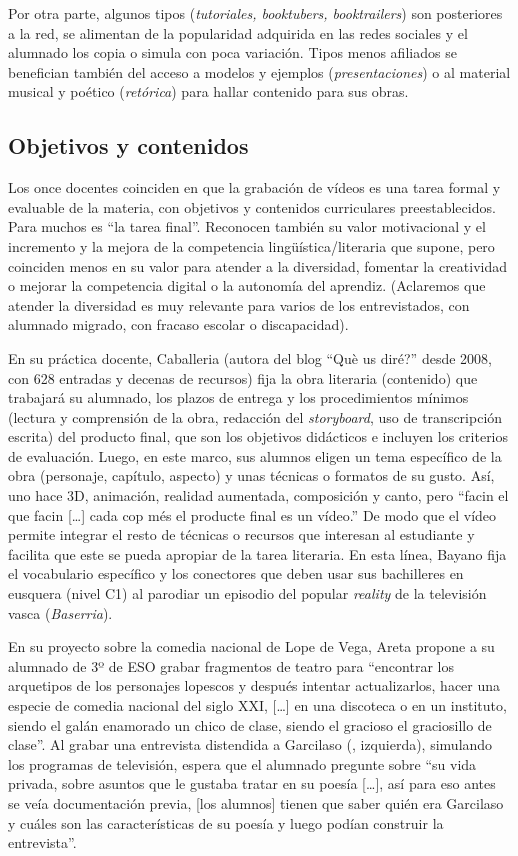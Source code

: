 \documentclass[spanish]{textolivre}
\begin{document}
Por otra parte, algunos tipos (\textit{tutoriales, booktubers, booktrailers}) son posteriores a la red, se alimentan de la popularidad adquirida en las redes sociales y el alumnado los copia o simula con poca variación. Tipos menos afiliados se benefician también del acceso a modelos y ejemplos (\textit{presentaciones}) o al material musical y poético (\textit{retórica}) para hallar contenido para sus obras.


\subsection{Objetivos y contenidos}\label{sec-organizacao}
Los once docentes coinciden en que la grabación de vídeos es una tarea formal y evaluable de la materia, con objetivos y contenidos curriculares preestablecidos. Para muchos es “la tarea final”. Reconocen también su valor motivacional y el incremento y la mejora de la competencia lingüística/literaria que supone, pero coinciden menos en su valor para atender a la diversidad, fomentar la creatividad o mejorar la competencia digital o la autonomía del aprendiz. (Aclaremos que atender la diversidad es muy relevante para varios de los entrevistados, con alumnado migrado, con fracaso escolar o discapacidad).

En su práctica docente, Caballeria (autora del blog “Què us diré?” desde 2008, con 628 entradas y decenas de recursos) fija la obra literaria (contenido) que trabajará su alumnado, los plazos de entrega y los procedimientos mínimos (lectura y comprensión de la obra, redacción del \textit{storyboard}, uso de transcripción escrita) del producto final, que son los objetivos didácticos e incluyen los criterios de evaluación. Luego, en este marco, sus alumnos eligen un tema específico de la obra (personaje, capítulo, aspecto) y unas técnicas o formatos de su gusto. Así, uno hace 3D, animación, realidad aumentada, composición y canto, pero “facin el que facin […] cada cop més el producte final es un vídeo.” De modo que el vídeo permite integrar el resto de técnicas o recursos que interesan al estudiante y facilita que este se pueda apropiar de la tarea literaria. En esta línea, Bayano fija el vocabulario específico y los conectores que deben usar sus bachilleres en eusquera (nivel C1) al parodiar un episodio del popular \textit{reality} de la televisión vasca (\textit{Baserria}).

En su proyecto sobre la comedia nacional de Lope de Vega, Areta propone a su alumnado de 3º de ESO grabar fragmentos de teatro para “encontrar los arquetipos de los personajes lopescos y después intentar actualizarlos, hacer una especie de comedia nacional del siglo XXI, […] en una discoteca o en un instituto, siendo el galán enamorado un chico de clase, siendo el gracioso el graciosillo de clase”. Al grabar una entrevista distendida a Garcilaso (, izquierda), simulando los programas de televisión, espera que el alumnado pregunte sobre “su vida privada, sobre asuntos que le gustaba tratar en su poesía […], así para eso antes se veía documentación previa, [los alumnos] tienen que saber quién era Garcilaso y cuáles son las características de su poesía y luego podían construir la entrevista”.
\end{document}
